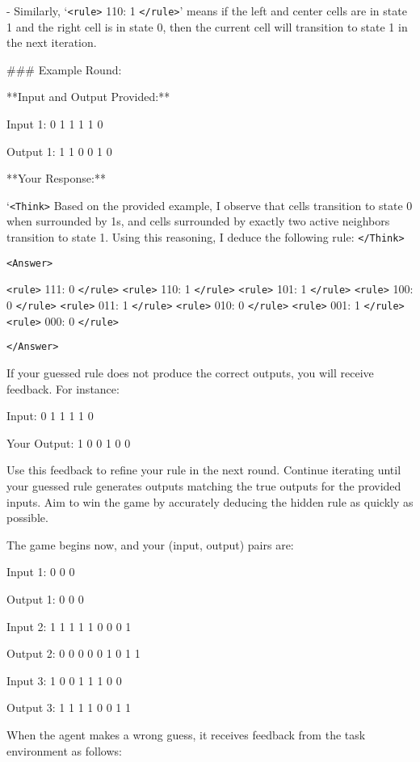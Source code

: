 \begin{tcolorbox}[colback=gray!20, colframe=black, title=Cellular Automata Agent Prompt]
- Similarly, `\texttt{<rule>} 110: 1 \texttt{</rule>}' means if the left and center cells are in state 1 and the right cell is in state 0, then the current cell will transition to state 1 in the next iteration.

\#\#\# Example Round:

**Input and Output Provided:**

Input 1: 0 1 1 1 1 0

Output 1: 1 1 0 0 1 0

**Your Response:**

`\texttt{<Think>} Based on the provided example, I observe that cells transition to state 0 when surrounded by 1s, and cells surrounded by exactly two active neighbors transition to state 1. Using this reasoning, I deduce the following rule: \texttt{</Think>}

\texttt{<Answer>}

\texttt{<rule>} 111: 0 \texttt{</rule>} \texttt{<rule>} 110: 1 \texttt{</rule>} \texttt{<rule>} 101: 1 \texttt{</rule>} \texttt{<rule>} 100: 0 \texttt{</rule>} \texttt{<rule>} 011: 1 \texttt{</rule>} \texttt{<rule>} 010: 0 \texttt{</rule>} \texttt{<rule>} 001: 1 \texttt{</rule>} \texttt{<rule>} 000: 0 \texttt{</rule>}

\texttt{</Answer>}

If your guessed rule does not produce the correct outputs, you will receive feedback. For instance:

Input: 0 1 1 1 1 0

Your Output: 1 0 0 1 0 0

Use this feedback to refine your rule in the next round. Continue iterating until your guessed rule generates outputs matching the true outputs for the provided inputs. Aim to win the game by accurately deducing the hidden rule as quickly as possible.

The game begins now, and your (input, output) pairs are: 

Input 1: 0 0 0

Output 1: 0 0 0

Input 2: 1 1 1 1 1 0 0 0 1

Output 2: 0 0 0 0 0 1 0 1 1

Input 3: 1 0 0 1 1 1 0 0

Output 3: 1 1 1 1 0 0 1 1
\end{tcolorbox}

\newpage 

When the agent makes a wrong guess, it receives feedback from the task environment as follows:

